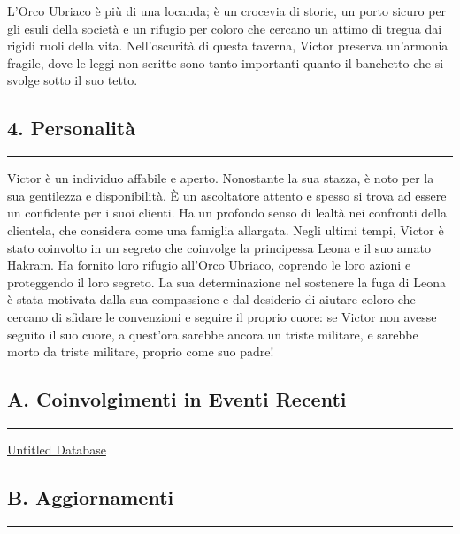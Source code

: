 L'Orco Ubriaco è più di una locanda; è un crocevia di storie, un porto
sicuro per gli esuli della società e un rifugio per coloro che cercano
un attimo di tregua dai rigidi ruoli della vita. Nell'oscurità di questa
taverna, Victor preserva un'armonia fragile, dove le leggi non scritte
sono tanto importanti quanto il banchetto che si svolge sotto il suo
tetto.

\subsection{4. Personalità}\label{personalituxe0}

\begin{center}\rule{0.5\linewidth}{0.5pt}\end{center}

Victor è un individuo affabile e aperto. Nonostante la sua stazza, è
noto per la sua gentilezza e disponibilità. È un ascoltatore attento e
spesso si trova ad essere un confidente per i suoi clienti. Ha un
profondo senso di lealtà nei confronti della clientela, che considera
come una famiglia allargata. Negli ultimi tempi, Victor è stato
coinvolto in un segreto che coinvolge la principessa Leona e il suo
amato Hakram. Ha fornito loro rifugio all'Orco Ubriaco, coprendo le loro
azioni e proteggendo il loro segreto. La sua determinazione nel
sostenere la fuga di Leona è stata motivata dalla sua compassione e dal
desiderio di aiutare coloro che cercano di sfidare le convenzioni e
seguire il proprio cuore: se Victor non avesse seguito il suo cuore, a
quest'ora sarebbe ancora un triste militare, e sarebbe morto da triste
militare, proprio come suo padre!

\subsection{A. Coinvolgimenti in Eventi
Recenti}\label{a.-coinvolgimenti-in-eventi-recenti}

\begin{center}\rule{0.5\linewidth}{0.5pt}\end{center}

\href{Untitled\%20Database\%209d3373b6ca9142f882c6d111e68562cb.csv}{Untitled
Database}

\subsection{B. Aggiornamenti}\label{b.-aggiornamenti}

\begin{center}\rule{0.5\linewidth}{0.5pt}\end{center}

\href{Untitled\%20baa9073e37d4412cb819296252ad4947.csv}{}
